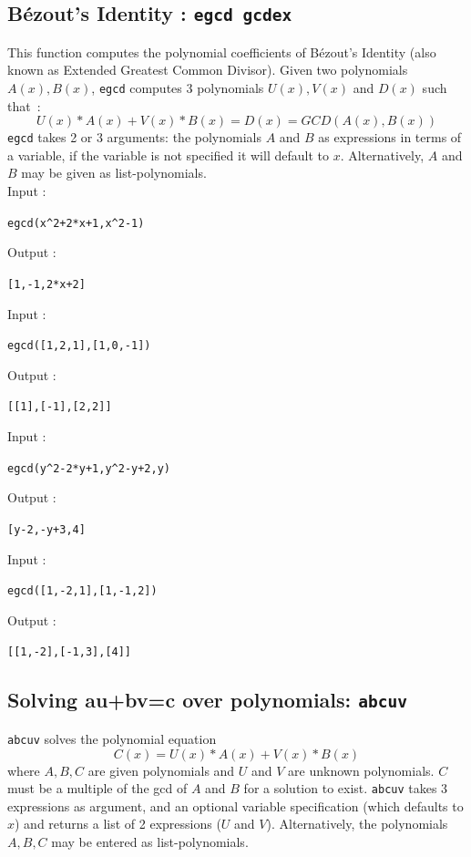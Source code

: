 \documentclass[a4paper,11pt]{book}
\begin{document}
\subsection{B\'ezout's Identity : {\tt egcd gcdex}}
This function computes the polynomial coefficients of B\'ezout's 
Identity (also known as Extended Greatest Common Divisor). 
Given two polynomials $A(x),B(x)$, {\tt egcd} computes 3 polynomials
$U(x),V(x)$ and $D(x)$ such that~:
\[    U(x)*A(x)+V(x)*B(x)=D(x)=GCD(A(x),B(x)) \]
{\tt egcd} takes 2 or 3 arguments: the polynomials $A$ and $B$ as
expressions in terms of a variable, if the variable is not specified
it will default to $x$. Alternatively, $A$ and $B$ may be given
as list-polynomials.\\
Input :
\begin{center}{\tt egcd(x\verb|^|2+2*x+1,x\verb|^|2-1)}\end{center}
Output :
\begin{center}{\tt  [1,-1,2*x+2]}\end{center}
Input :
\begin{center}{\tt egcd([1,2,1],[1,0,-1])}\end{center}
Output :
\begin{center}{\tt  [[1],[-1],[2,2]]}\end{center}
Input :
\begin{center}{\tt egcd(y\verb|^|2-2*y+1,y\verb|^|2-y+2,y)}\end{center}
Output :
\begin{center}{\tt  [y-2,-y+3,4]}\end{center}
Input :
\begin{center}{\tt egcd([1,-2,1],[1,-1,2])}\end{center}
Output :
\begin{center}{\tt [[1,-2],[-1,3],[4]]}\end{center}

\subsection{Solving au+bv=c over polynomials: {\tt abcuv}}
{\tt abcuv} solves the polynomial equation
\[ C(x)=U(x)*A(x)+V(x)*B(x) \]
where $A,B,C$ are given polynomials and $U$ and $V$ are unknown
polynomials. $C$ must be a multiple of the gcd of $A$ and $B$
for a solution to exist. {\tt abcuv} takes 3 expressions as argument,
and an optional variable specification (which defaults to $x$)
and returns a list of 2 expressions ($U$ and $V$). Alternatively, the
polynomials $A,B,C$ may be entered as list-polynomials.
\end{document}
